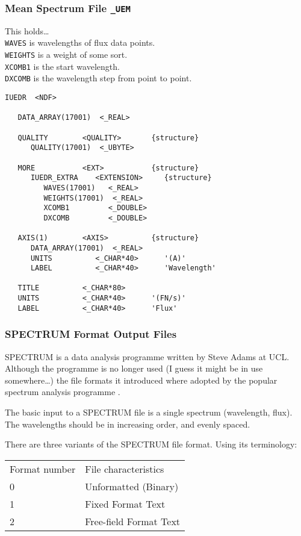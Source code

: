 \subsubsection{Mean Spectrum File {\tt \_UEM}}

This holds\ldots\\
{\tt WAVES} is wavelengths of flux data points.\\
{\tt WEIGHTS} is a weight of some sort.\\
{\tt XCOMB1} is the start wavelength.\\
{\tt DXCOMB} is the wavelength step from point to point.

\begin{verbatim}
IUEDR  <NDF>

   DATA_ARRAY(17001)  <_REAL>

   QUALITY        <QUALITY>       {structure}
      QUALITY(17001)  <_UBYTE>

   MORE           <EXT>           {structure}
      IUEDR_EXTRA    <EXTENSION>     {structure}
         WAVES(17001)   <_REAL>
         WEIGHTS(17001)  <_REAL>
         XCOMB1         <_DOUBLE>
         DXCOMB         <_DOUBLE>

   AXIS(1)        <AXIS>          {structure}
      DATA_ARRAY(17001)  <_REAL>
      UNITS          <_CHAR*40>      '(A)'
      LABEL          <_CHAR*40>      'Wavelength'

   TITLE          <_CHAR*80>
   UNITS          <_CHAR*40>      '(FN/s)'
   LABEL          <_CHAR*40>      'Flux'
\end{verbatim}

\subsubsection{\label{subap:spectrum}SPECTRUM Format
               Output Files}

SPECTRUM is a data analysis programme written by Steve Adams at UCL\@.
Although the programme is no longer used (I guess it might be in use
somewhere\ldots) the file formats it introduced
where adopted by the popular
spectrum analysis programme .

The basic input to a SPECTRUM file is a single spectrum (wavelength, flux)\@.
The wavelengths should be in increasing order, and evenly spaced.

There are three variants of the SPECTRUM file format.  Using its terminology:

\begin{latexonly}
\begin{tabular}{ll}
Format number & File characteristics\\
0             & Unformatted (Binary)\\
1             & Fixed Format Text\\
2             & Free-field Format Text\\
\end{tabular}
\end{latexonly}

